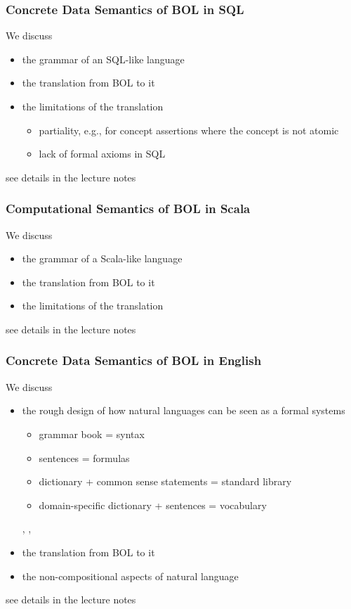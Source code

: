 \begin{frame}\frametitle{Concrete Data Semantics of BOL in SQL}
We discuss
\begin{itemize}
\item the grammar of an SQL-like language
\item the translation from BOL to it
\item the limitations of the translation
 \begin{itemize}
 \item partiality, e.g., for concept assertions where the concept is not atomic
 \item lack of formal axioms in SQL
 \end{itemize}
\end{itemize}
see details in the lecture notes
\end{frame}

\begin{frame}\frametitle{Computational Semantics of BOL in Scala}
We discuss
\begin{itemize}
\item the grammar of a Scala-like language
\item the translation from BOL to it
\item the limitations of the translation
\end{itemize}
see details in the lecture notes
\end{frame}


\begin{frame}\frametitle{Concrete Data Semantics of BOL in English}
We discuss
\begin{itemize}
\item the rough design of how natural languages can be seen as a formal systems
  \begin{itemize}
  \item grammar book = syntax
  \item sentences = formulas
  \item dictionary + common sense statements = standard library
  \item domain-specific dictionary + sentences = vocabulary
  \end{itemize}, , 
\item the translation from BOL to it
\item the non-compositional aspects of natural language
\end{itemize}
see details in the lecture notes
\end{frame}

